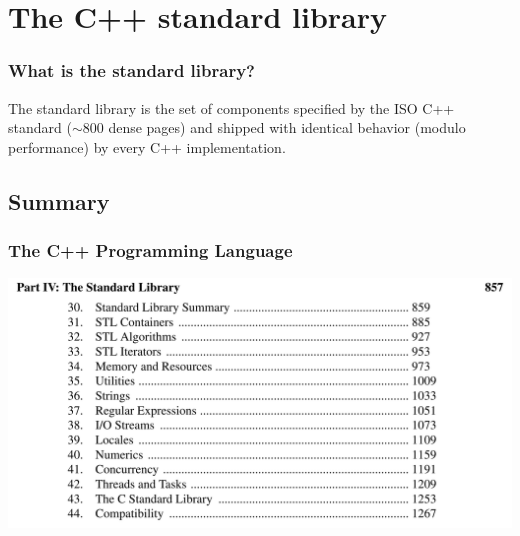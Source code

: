 \section{The C++ standard library}
\begin{frame}
  \frametitle{What is the standard library?}
  The standard library is the set of components specified by the ISO C++ standard ($\sim 800$ dense pages) and shipped with identical behavior (modulo performance) by every C++ implementation. 
\end{frame}
\subsection{Summary}
\begin{frame}
  \frametitle{The C++ Programming Language}
  \centering
  \includegraphics[height=0.7\textheight]{img/summary.png}
\end{frame}

